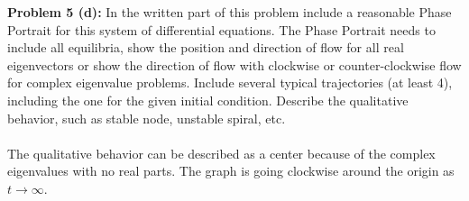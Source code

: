 \documentclass[12pt]{article}
\begin{document}
\noindent \textbf{Problem 5 (d): }In the written part of this problem include a reasonable Phase Portrait for this system of differential equations. The Phase Portrait needs to include all equilibria, show the position and direction of flow for all real eigenvectors or show the direction of flow with clockwise or counter-clockwise flow for complex eigenvalue problems. Include several typical trajectories (at least 4), including the one for the given initial condition. Describe the qualitative behavior, such as stable node, unstable spiral, etc.
\\ \\
The qualitative behavior can be described as a center because of the complex eigenvalues with no real parts. The graph is going clockwise around the origin as $t \rightarrow \infty$.

\newpage 
\end{document}
